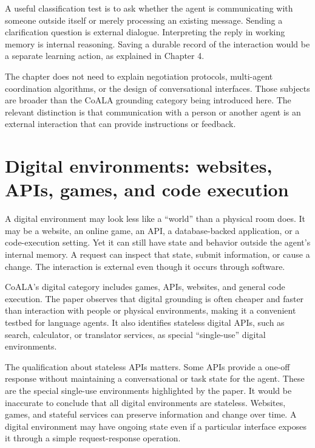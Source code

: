 \begin{tipbox}
A useful classification test is to ask whether the agent is communicating with someone outside itself or merely processing an existing message. Sending a clarification question is external dialogue. Interpreting the reply in working memory is internal reasoning. Saving a durable record of the interaction would be a separate learning action, as explained in Chapter 4.
\end{tipbox}

The chapter does not need to explain negotiation protocols, multi-agent coordination algorithms, or the design of conversational interfaces. Those subjects are broader than the CoALA grounding category being introduced here. The relevant distinction is that communication with a person or another agent is an external interaction that can provide instructions or feedback.

\section{Digital environments: websites, APIs, games, and code execution}
\label{sec:digital-environments}

A digital environment may look less like a ``world'' than a physical room does. It may be a website, an online game, an API, a database-backed application, or a code-execution setting. Yet it can still have state and behavior outside the agent's internal memory. A request can inspect that state, submit information, or cause a change. The interaction is external even though it occurs through software.

CoALA's digital category includes games, APIs, websites, and general code execution. The paper observes that digital grounding is often cheaper and faster than interaction with people or physical environments, making it a convenient testbed for language agents. It also identifies stateless digital APIs, such as search, calculator, or translator services, as special ``single-use'' digital environments.

The qualification about stateless APIs matters. Some APIs provide a one-off response without maintaining a conversational or task state for the agent. These are the special single-use environments highlighted by the paper. It would be inaccurate to conclude that all digital environments are stateless. Websites, games, and stateful services can preserve information and change over time. A digital environment may have ongoing state even if a particular interface exposes it through a simple request-response operation.

